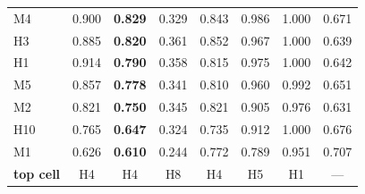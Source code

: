 \begin{table}[!htbp]
\begin{tabular*}{\textwidth}{@{\extracolsep{\fill}}lccccccc@{}}
M4 & 0.900 & \textbf{0.829} & 0.329 & 0.843 & 0.986 & 1.000 & 0.671 \\
H3 & 0.885 & \textbf{0.820} & 0.361 & 0.852 & 0.967 & 1.000 & 0.639 \\
H1 & 0.914 & \textbf{0.790} & 0.358 & 0.815 & 0.975 & 1.000 & 0.642 \\
M5 & 0.857 & \textbf{0.778} & 0.341 & 0.810 & 0.960 & 0.992 & 0.651 \\
M2 & 0.821 & \textbf{0.750} & 0.345 & 0.821 & 0.905 & 0.976 & 0.631 \\
H10 & 0.765 & \textbf{0.647} & 0.324 & 0.735 & 0.912 & 1.000 & 0.676 \\
M1 & 0.626 & \textbf{0.610} & 0.244 & 0.772 & 0.789 & 0.951 & 0.707 \\
\midrule
\textbf{top cell} & H4 & H4 & H8 & H4 & H5 & H1 & --- \\
\bottomrule
\end{tabular*}
\end{table}